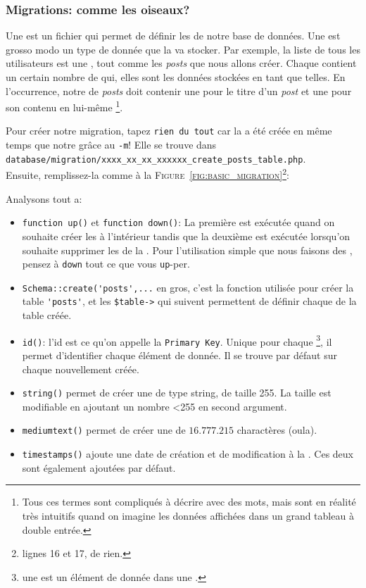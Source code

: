 \subsubsection[Migrations: théorie][laravel.com/docs/12.x/migrations\#introduction]{Migrations: comme les oiseaux?}

Une \migration{} est un fichier qui permet de définir les \tables{} de notre base de données. Une \table{} est grosso modo un type de donnée que la \db{} va stocker. Par exemple, la liste de tous les utilisateurs est une \table{}, tout comme les \textit{posts} que nous allons créer. Chaque \table{} contient un certain nombre de \columns{} qui, elles sont les données stockées en tant que telles. En l'occurrence, notre \table{} de \textit{posts} doit contenir une \column{} pour le titre d'un \textit{post} et une pour son contenu en lui-même \footnote{Tous ces termes sont compliqués à décrire avec des mots, mais sont en réalité très intuitifs quand on imagine les données affichées dans un grand tableau à double entrée.}.

Pour créer notre migration, tapez \verb|rien du tout| car la \migration{} a été créée en même temps que notre \model{} grâce au \verb|-m|! Elle se trouve dans \\\verb|database/migration/xxxx_xx_xx_xxxxxx_create_posts_table.php|. \\Ensuite, remplissez-la comme à la \textsc{Figure~\ref{fig:basic_migration}}\footnote{lignes 16 et 17, de rien.}:

Analysons tout a:
\begin{itemize}
    \item \verb|function up()| et \verb|function down()|: La première est exécutée quand on souhaite créer les \tables{} à l'intérieur tandis que la deuxième est exécutée lorsqu'on souhaite supprimer les \tables{} de la \db{}. Pour l'utilisation simple que nous faisons des \migrations{}, pensez à \verb|down| tout ce que vous \verb|up|-per.
    \item \verb|Schema::create('posts',...| en gros, c'est la fonction utilisée pour créer la table \verb|'posts'|, et les \verb|$table->| qui suivent permettent de définir chaque \column{} de la table créée.
    \item \verb|id()|: l'id est ce qu'on appelle la \texttt{Primary Key}. Unique pour chaque \row{}\footnote{une \row{} est un élément de donnée dans une \table{}.}, il permet d'identifier chaque élément de donnée. Il se trouve par défaut sur chaque \table{} nouvellement créée.
    \item \verb|string()| permet de créer une \column{} de type string, de taille 255. La taille est modifiable en ajoutant un nombre <255 en second argument.
    \item \verb|mediumtext()| permet de créer une \column{} de $16.777.215$ charactères (oula).
    \item \verb|timestamps()| ajoute une date de création et de modification à la \table{}. Ces deux \columns{} sont également ajoutées par défaut.
\end{itemize}


